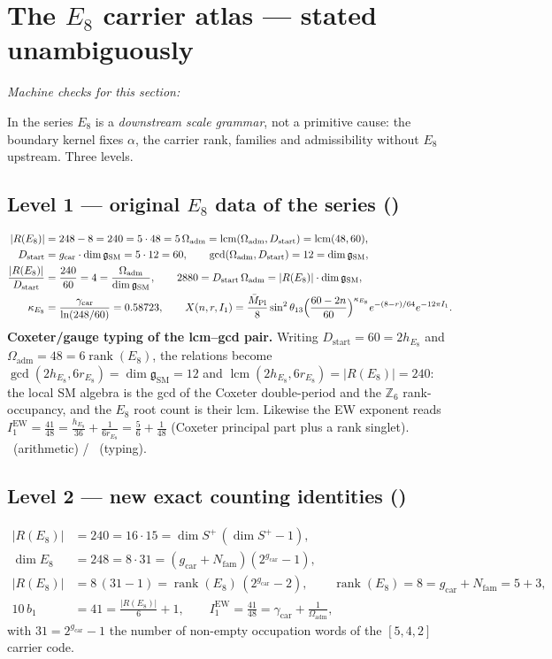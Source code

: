 \documentclass[11pt,a4paper]{article}
\newcommand{\Mbar}{\bar M_{\mathrm{Pl}}}
\newcommand{\gcar}{g_{\mathrm{car}}}
\newcommand{\Nfam}{N_{\mathrm{fam}}}
\newcommand{\Oadm}{\Omega_{\mathrm{adm}}}
\newcommand{\dimg}{\dim\mathfrak g_{\mathrm{SM}}}
\newcommand{\Dstart}{D_{\mathrm{start}}}
\newcommand{\kappaE}{\kappa_{E_8}}
\theoremstyle{definition}
\begin{document}
\section{The $E_8$ carrier atlas --- stated unambiguously}
\noindent\emph{Machine checks for this section:} 

\label{sec:e8}

In the series $E_8$ is a \emph{downstream scale grammar}, not a primitive cause: the boundary kernel
fixes $\alpha$, the carrier rank, families and admissibility without $E_8$ upstream. Three levels.

\subsection{Level 1 --- original $E_8$ data of the series (\mE)}
\begin{align}
  |R(E_8)| &= 248-8=240=5\cdot48=5\,\Oadm=\operatorname{lcm}(\Oadm,\Dstart)=\operatorname{lcm}(48,60), \\
  \Dstart &= \gcar\cdot\dimg=5\cdot12=60,\qquad \gcd(\Oadm,\Dstart)=12=\dimg, \\
  \frac{|R(E_8)|}{\Dstart} &= \frac{240}{60}=4=\frac{\Oadm}{\dimg},\qquad
  2880=\Dstart\,\Oadm=|R(E_8)|\cdot\dimg, \\
  \kappaE &= \frac{\gamma_{\mathrm{car}}}{\ln(248/60)}=0.58723,\qquad
  X(n,r,I_1)=\frac{\Mbar}{8}\sin^2\theta_{13}\Bigl(\frac{60-2n}{60}\Bigr)^{\kappaE}e^{-(8-r)/64}e^{-12\pi I_1}.
\end{align}
\textbf{Coxeter/gauge typing of the lcm--gcd pair.} Writing $\Dstart=60=2h_{E_8}$ and
$\Oadm=48=6\operatorname{rank}(E_8)$, the relations become
$\gcd(2h_{E_8},6r_{E_8})=\dimg=12$ and $\operatorname{lcm}(2h_{E_8},6r_{E_8})=|R(E_8)|=240$: the local
SM algebra is the gcd of the Coxeter double-period and the $\mathbb Z_6$ rank-occupancy, and the $E_8$
root count is their lcm. Likewise the EW exponent reads
$I_1^{\mathrm{EW}}=\tfrac{41}{48}=\tfrac{h_{E_8}}{36}+\tfrac{1}{6r_{E_8}}=\tfrac56+\tfrac{1}{48}$
(Coxeter principal part plus a rank singlet). \mE\ (arithmetic) / \mC\ (typing).

\subsection{Level 2 --- new exact counting identities (\mE)}
\begin{align}
  |R(E_8)| &= 240 = 16\cdot15=\dim S^+\,(\dim S^+-1), \\
  \dim E_8 &= 248 = 8\cdot31=(\gcar+\Nfam)(2^{\gcar}-1), \\
  |R(E_8)| &= 8\,(31-1)=\operatorname{rank}(E_8)\,(2^{\gcar}-2),\qquad \operatorname{rank}(E_8)=8=\gcar+\Nfam=5+3, \\
  10\,b_1 &= 41 = \frac{|R(E_8)|}{6}+1,\qquad I_1^{\mathrm{EW}}=\frac{41}{48}=\gamma_{\mathrm{car}}+\frac{1}{\Oadm},
\end{align}
with $31=2^{\gcar}-1$ the number of non-empty occupation words of the $[5,4,2]$ carrier code.
\end{document}
